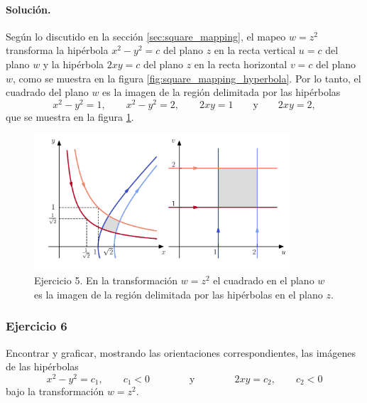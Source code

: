 \documentclass[a4paper]{report}
\begin{document}
\paragraph{Solución.} Según lo discutido en la sección \ref{sec:square_mapping}, el mapeo \(w=z^2\) transforma la hipérbola \(x^2-y^2=c\) del plano \(z\) en la recta vertical \(u=c\) del plano \(w\) y la hipérbola \(2xy=c\) del plano \(z\) en la recta horizontal \(v=c\) del plano \(w\), como se muestra en la figura \ref{fig:square_mapping_hyperbola}. Por lo tanto, el cuadrado del plano \(w\) es la imagen de la región delimitada por las hipérbolas
\[
 x^2-y^2=1,\qquad x^2-y^2=2, \qquad 2xy=1\qquad\textrm{y}\qquad 2xy=2, 
\]
que se muestra en la figura \ref{fig:exercise_14_05}. 
\begin{figure}[!htb]
 \begin{center}
 \includegraphics[width=0.85\textwidth]{figuras/exercise_14_05.pdf}
 \caption{\label{fig:exercise_14_05} Ejercicio 5. En la transformación \(w=z^2\) el cuadrado en el plano \(w\) es la imagen de la región delimitada por las hipérbolas en el plano \(z\).}
 \end{center}
\end{figure}

\subsubsection{Ejercicio 6}

Encontrar y graficar, mostrando las orientaciones correspondientes, las imágenes de las hipérbolas 
\[
 x^2-y^2=c_1,\qquad c_1<0\qquad\qquad\textrm{y}\qquad\qquad 2xy=c_2,\qquad c_2<0
\]
bajo la transformación \(w=z^2\).
\end{document}
